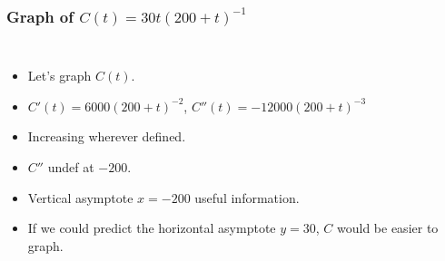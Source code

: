 \documentclass[serif,ignorenonframetext]{beamer}
\newcommand{\ds}{\displaystyle}
\begin{document}
\begin{frame}
  \frametitle{Graph of $C(t)=30t(200+t)^{-1}$}
  \begin{columns}
  \begin{itemize}[<+->]
  \item Let's graph $C(t)$.
  \item $\ds C'(t)=6000(200+t)^{-2}$, 
    $\ds C''(t)=-12000(200+t)^{-3}$
  \item Increasing wherever defined.
  \item $C''$ undef at $-200$. 
    \uncover<+->{}
  \item Vertical asymptote $x=-200$ useful information.
    \uncover<+->{}\uncover<+->{}
  \item If we could predict the horizontal asymptote $y=30$, $C$ would
    be easier to graph.
  \end{itemize}

\end{columns}
\end{frame}
\end{document}
